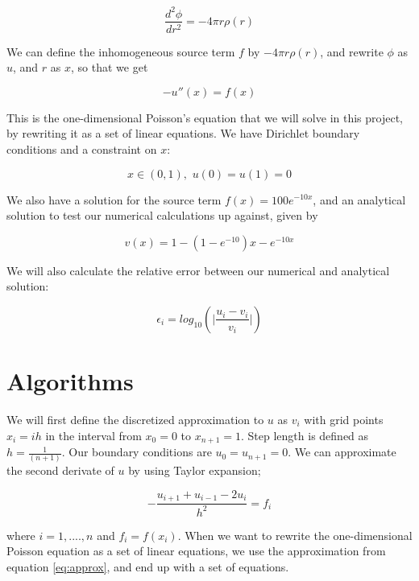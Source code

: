 \documentclass[oneside, final, 11pt, english, twocolumn]{article}
\begin{document}
\begin{equation}
\frac{d^2 \phi}{dr^2} = -4 \pi r \rho(r)
\end{equation}

We can define the inhomogeneous source term $f$ by $-4 \pi r \rho(r)$, and rewrite $\phi$ as $u$, and $r$ as $x$, so that we get

\begin{equation}
-u'' (x) = f(x)
\end{equation}

This is the one-dimensional Poisson's equation that we will solve in this project, by rewriting it as a set of linear equations. We have Dirichlet boundary conditions and a constraint on $x$:

\[x \in (0,1), \,\,  u(0) = u(1) = 0 \]

We also have a solution for the source term $f(x) = 100 e^{-10x}$, and an analytical solution to test our numerical calculations up against, given by 

\begin{equation}
v(x) = 1 - (1-e^{-10})x - e^{-10x}
\end{equation}

We will also calculate the relative error between our numerical and analytical solution:

\begin{equation}
\epsilon_i = log_{10}(\vert \frac{u_i - v_i}{v_i} \lvert )
\end{equation}


\section{Algorithms}

We will first define the discretized approximation to $u$ as $v_i$ with grid points $x_i =  ih$ in the interval from $x_0 = 0$ to $x_{n+1} = 1$. Step length is defined as $h = \frac{1}{(n+1)}$. Our boundary conditions are $u_0 = u_{n+1} = 0$. We can approximate the second derivate of $u$ by using Taylor expansion; 

\begin{equation}
- \frac{u_{i+1} + u_{i-1} - 2u_i}{h^2} = f_i
\label{eq:approx}
\end{equation}

where $i = 1,....,n$ and $f_i = f(x_i)$. When we want to rewrite the one-dimensional Poisson equation as a set of linear equations, we use the approximation from equation \eqref{eq:approx}, and end up with a set of equations. 
\end{document}
